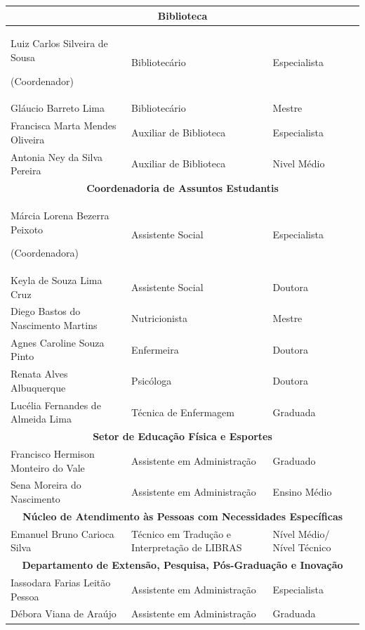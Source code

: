\documentclass{paper}
\begin{document}
\begin{longtable}{|p{6cm}|p{5.5cm}|p{2.3cm}|}
\multicolumn{3}{|c|}{\textbf{Biblioteca}} \\
\hline
Luiz Carlos Silveira de Sousa 

(Coordenador) & Bibliotecário & Especialista \\ \hline 
Gláucio Barreto Lima & Bibliotecário & Mestre \\ \hline
Francisca Marta Mendes Oliveira & Auxiliar de Biblioteca & Especialista \\ \hline 
Antonia Ney da Silva Pereira & Auxiliar de Biblioteca & Nivel Médio \\ \hline

\multicolumn{3}{|c|}{\textbf{Coordenadoria de Assuntos Estudantis}} \\
\hline
Márcia Lorena Bezerra Peixoto 

(Coordenadora) & Assistente Social & Especialista \\ \hline
Keyla de Souza Lima Cruz & Assistente Social & Doutora \\ \hline
Diego Bastos do Nascimento Martins & Nutricionista & Mestre \\ \hline
Agnes Caroline Souza Pinto & Enfermeira & Doutora \\ \hline
Renata Alves Albuquerque & Psicóloga & Doutora \\ \hline
Lucélia Fernandes de Almeida Lima & Técnica de Enfermagem & Graduada \\ \hline

\multicolumn{3}{|c|}{\textbf{Setor de Educação Física e Esportes}} \\
\hline
Francisco Hermison Monteiro do Vale & Assistente em Administração & Graduado \\ \hline 
Sena Moreira do Nascimento & Assistente em Administração & Ensino Médio  \\ \hline

\multicolumn{3}{|c|}{\textbf{Núcleo de Atendimento às Pessoas com Necessidades Específicas}} \\
\hline
Emanuel Bruno Carioca Silva & Técnico em Tradução e Interpretação de LIBRAS & Nível Médio/ Nível Técnico  \\ \hline

\multicolumn{3}{|c|}{\textbf{Departamento de Extensão, Pesquisa, Pós-Graduação e Inovação}} \\
\hline
Iassodara Farias Leitão Pessoa & Assistente em Administração & Especialista \\ \hline
Débora Viana de Araújo & Assistente em Administração & Graduada \\ \hline
\end{longtable}
\end{document}
